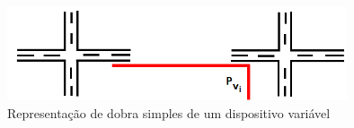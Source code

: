 \begin{figure}[htb]	
\center%
\includegraphics[width=10cm]{./img/gadgetVariavel.png}
\caption{Representação de dobra simples de um dispositivo variável}
\label{fig:gadgetVariavel}
\end{figure}